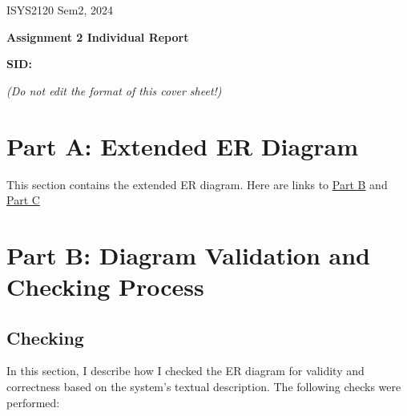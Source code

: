 \documentclass[a4paper,12pt]{article}
\begin{document}
\begin{flushright}
    ISYS2120 Sem2, 2024
\end{flushright}

\vspace{2cm}

\begin{center}
    \Huge \textbf{Assignment 2 Individual Report}
\end{center}

\vspace{2cm}

\noindent
\textbf{SID:}

\vspace{1cm}

\begin{center}
\end{center}

\vspace{2cm}

\begin{center}
    \textit{(Do not edit the format of this cover sheet!)}
\end{center}

\newpage
\section*{Part A: Extended ER Diagram}
\noindent
This section contains the extended ER diagram. Here are links to \hyperlink{PartB}{Part B} and \hyperlink{PartC}{Part C}



\newpage

\section*{Part B: Diagram Validation and Checking Process}
\hypertarget{PartB}{}
\noindent

\subsection*{Checking}
In this section, I describe how I checked the ER diagram for validity and correctness based on the system's textual description. The following checks were performed:
\end{document}
